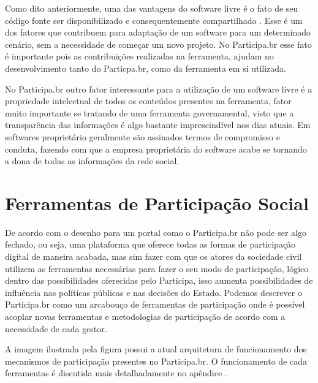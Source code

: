 Como dito anteriormente, uma das vantagens do software livre é o fato de seu código fonte ser disponibilizado e consequentemente compartilhado \cite{bucher2013rede}. Esse é um dos fatores que contribuem para adaptação de um software para um determinado cenário, sem a necessidade de começar um novo projeto. No Participa.br esse fato é importante pois as contribuições realizadas na ferramenta, ajudam no desenvolvimento tanto do Particpa.br, como da ferramenta em si utilizada.

No Participa.br outro fator interessante para a utilização de um software livre é a propriedade intelectual de todos os conteúdos presentes na ferramenta, fator muito importante se tratando de uma ferramenta governamental, visto que a transparência das informações é algo bastante imprescindível nos dias atuais. Em softwares proprietário geralmente são assinados termos de compromisso e conduta, fazendo com que a empresa proprietária do software acabe se tornando a dona de todas as informações da rede social.

\section{Ferramentas de Participação Social}

De acordo com \cite{solagna2014metodologias} o desenho para um portal como o Participa.br não pode ser algo fechado, ou seja, uma plataforma que oferece todas as formas de participação digital de maneira acabada, mas sim fazer com que os atores da sociedade civil utilizem as ferramentas necessárias para fazer o seu modo de participação, lógico dentro das possibilidades oferecidas pelo Participa, isso aumenta possibilidades de influência nas políticas públicas e nas decisões do Estado. Podemos descrever o Participa.br como um arcabouço de ferramentas de participação onde é possível acoplar novas ferramentas e metodologias de participação de acordo com a necessidade de cada gestor.

A imagem ilustrada pela figura \label{fig:arquiteturaparticipa} possui a atual arquitetura de funcionamento dos mecanismos de participação presentes no Participa.br. O funcionamento de cada ferramentas é discutida mais detalhadamente no apêndice \label{Att:ferramentasparticipacao}.

